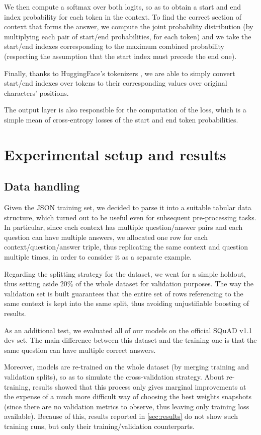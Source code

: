 \documentclass[a4paper,10pt]{report}
\begin{document}
We then compute a softmax over both logits, so as to obtain a start and end index probability for each token in the context. To find the correct section of context that forms the answer, we compute the joint probability distribution (by multiplying each pair of start/end probabilities, for each token) and we take the start/end indexes corresponding to the maximum combined probability (respecting the assumption that the start index must precede the end one).

Finally, thanks to HuggingFace's tokenizers \cite{tokenizers}, we are able to simply convert start/end indexes over tokens to their corresponding values over original characters' positions.

The output layer is also responsible for the computation of the loss, which is a simple mean of cross-entropy losses of the start and end token probabilities.

\chapter{Experimental setup and results}\label{chap:experiments}
 
\section{Data handling}\label{sec:data-handling}
Given the JSON training set, we decided to parse it into a suitable tabular data structure, which turned out to be useful even for subsequent pre-processing tasks. In particular, since each context has multiple question/answer pairs and each question can have multiple answers, we allocated one row for each context/question/answer triple, thus replicating the same context and question multiple times, in order to consider it as a separate example.

Regarding the splitting strategy for the dataset, we went for a simple holdout, thus setting aside $20\%$ of the whole dataset for validation purposes. The way the validation set is built guarantees that the entire set of rows referencing to the same context is kept into the same split, thus avoiding unjustifiable boosting of results.

As an additional test, we evaluated all of our models on the official SQuAD v1.1 dev set. The main difference between this dataset and the training one is that the same question can have multiple correct answers.

Moreover, models are re-trained on the whole dataset (by merging training and validation splits), so as to simulate the cross-validation strategy. About re-training, results showed that this process only gives marginal improvements at the expense of a much more difficult way of choosing the best weights snapshots (since there are no validation metrics to observe, thus leaving only training loss available). Because of this, results reported in \ref{sec:results} do not show such training runs, but only their training/validation counterparts.  
\end{document}
